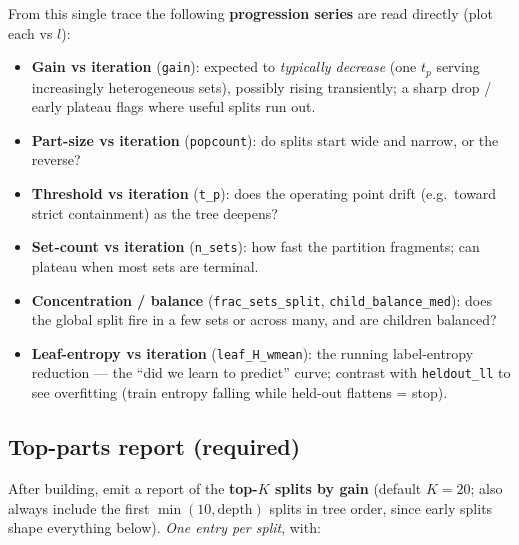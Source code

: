 \documentclass[11pt]{article}
\newcommand{\code}[1]{\texttt{#1}}
\begin{document}
\noindent From this single trace the following \textbf{progression series} are read directly (plot each vs $l$):
\begin{itemize}[nosep]
\item \textbf{Gain vs iteration} (\code{gain}): expected to \emph{typically decrease} (one $t_p$ serving increasingly heterogeneous sets), possibly rising transiently; a sharp drop / early plateau flags where useful splits run out.
\item \textbf{Part-size vs iteration} (\code{popcount}): do splits start wide and narrow, or the reverse?
\item \textbf{Threshold vs iteration} (\code{t\_p}): does the operating point drift (e.g.\ toward strict containment) as the tree deepens?
\item \textbf{Set-count vs iteration} (\code{n\_sets}): how fast the partition fragments; can plateau when most sets are terminal.
\item \textbf{Concentration / balance} (\code{frac\_sets\_split}, \code{child\_balance\_med}): does the global split fire in a few sets or across many, and are children balanced?
\item \textbf{Leaf-entropy vs iteration} (\code{leaf\_H\_wmean}): the running label-entropy reduction --- the ``did we learn to predict'' curve; contrast with \code{heldout\_ll} to see overfitting (train entropy falling while held-out flattens = stop).
\end{itemize}


\subsection{Top-parts report (required)}
After building, emit a report of the \textbf{top-$K$ splits by gain} (default $K=20$; also always include the first $\min(10,\text{depth})$ splits in tree order, since early splits shape everything below). \emph{One entry per split}, with:
\end{document}
